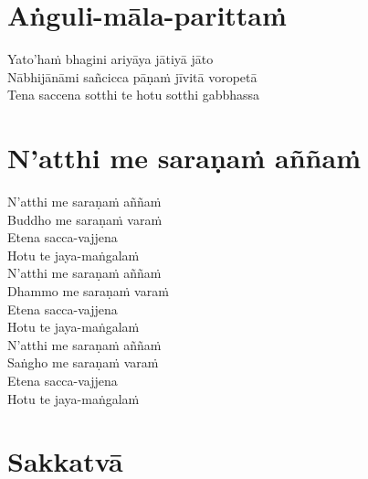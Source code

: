 \chapter{Aṅguli-māla-parittaṁ}%


\begin{paritta}
Yato'haṁ bhagini ariyāya jātiyā jāto\\
Nābhijānāmi sañcicca pāṇaṁ jīvitā voropetā\\
Tena saccena sotthi te hotu sotthi gabbhassa



\end{paritta}

\clearpage

\chapter{N'atthi me saraṇaṁ aññaṁ}%


\begin{paritta}
N'atthi me saraṇaṁ aññaṁ\\
Buddho me saraṇaṁ varaṁ\\
Etena sacca-vajjena\\
Hotu te jaya-maṅgalaṁ\\
N'atthi me saraṇaṁ aññaṁ\\
Dhammo me saraṇaṁ varaṁ\\
Etena sacca-vajjena\\
Hotu te jaya-maṅgalaṁ\\
N'atthi me saraṇaṁ aññaṁ\\
Saṅgho me saraṇaṁ varaṁ\\
Etena sacca-vajjena\\
Hotu te jaya-maṅgalaṁ
\end{paritta}

\chapter{Sakkatvā}%


